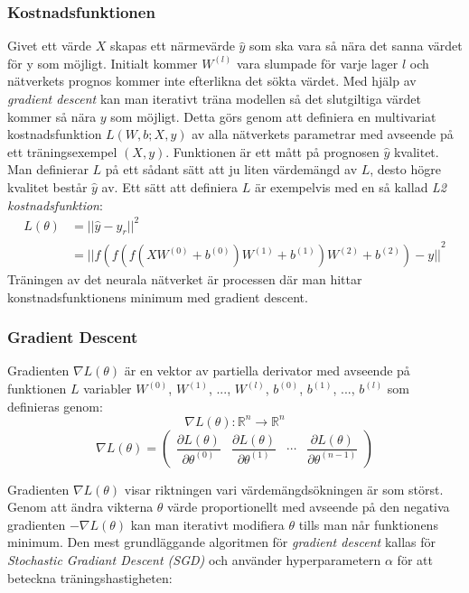 \documentclass[a4paper,11pt,twoside]{article}
\newcommand*{\pd}[2]{\ensuremath{\dfrac{\partial #1}{\partial #2}}}
\begin{document}
\subsubsection{Kostnadsfunktionen}
Givet ett värde $X$ skapas ett närmevärde $\hat{y}$ som ska vara så nära det sanna värdet för y som möjligt. Initialt kommer $W^{(l)}$ vara slumpade för varje lager $l$ och nätverkets prognos kommer inte efterlikna det sökta värdet. Med hjälp av \textit{gradient descent} kan man iterativt träna modellen så det slutgiltiga värdet kommer så nära $y$ som möjligt. Detta görs genom att definiera en multivariat kostnadsfunktion $L(W, b; X,y)$ av alla nätverkets parametrar med avseende på ett träningsexempel $(X, y)$. Funktionen är ett mått på prognosen $\hat{y}$ kvalitet. Man definierar $L$ på ett sådant sätt att ju liten värdemängd av $L$, desto högre kvalitet består $\hat{y}$ av. Ett sätt att definiera $L$ är exempelvis med en så kallad \textit{L2 kostnadsfunktion}: \cite{cs231n} \cite{wikiStanford}
\begin{equation}
\begin{split}
L(\theta) 	& = {||\hat{y}-y_r||}^2 \\
		& = {||f(f(f(XW^{(0)} +b^{(0)})W^{(1)} +b^{(1)})W^{(2)} +b^{(2)}) - y||}^2
\end{split}
\end{equation}
Träningen av det neurala nätverket är processen där man hittar konstnadsfunktionens minimum med gradient descent.
\subsubsection{Gradient Descent}
Gradienten $\nabla L(\theta)$ är en vektor av partiella derivator med avseende på funktionen $L$ variabler $W^{(0)}$, $W^{(1)}$, ..., $W^{(l)}$, $b^{(0)}$, $b^{(1)}$, ..., $b^{(l)}$ som definieras genom: \cite{gradient} \cite{convmath} 
\begin{equation}
\nabla L(\theta) : \mathbb{R}^n \to \mathbb{R}^n
\end{equation}
\begin{equation}
\nabla L(\theta) = 
	\begin{pmatrix} 
		\pd{L(\theta)}{\theta^{(0)}} & 
		\pd{L(\theta)}{\theta^{(1)}} &
		\cdots &
		\pd{L(\theta)}{\theta^{(n-1)}}
		
		\end{pmatrix}
\end{equation}

Gradienten $\nabla L(\theta)$ visar riktningen vari värdemängdsökningen är som störst. Genom att ändra vikterna $\theta$ värde proportionellt med avseende på den negativa gradienten $-\nabla L(\theta)$ kan man iterativt modifiera $\theta$ tills man når funktionens minimum. Den mest grundläggande algoritmen för \textit{gradient descent} kallas för \textit{Stochastic Gradiant Descent (SGD)} och använder hyperparametern $\alpha$ för att beteckna träningshastigheten: \cite{gradient} \cite{convmath} \cite{wikiStanford}
\end{document}
